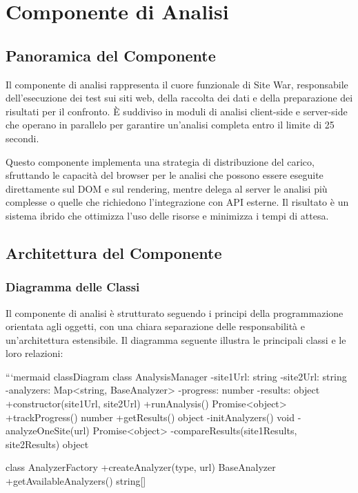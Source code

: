 \chapter{Componente di Analisi}

\section{Panoramica del Componente}
Il componente di analisi rappresenta il cuore funzionale di Site War, responsabile dell'esecuzione dei test sui siti web, della raccolta dei dati e della preparazione dei risultati per il confronto. È suddiviso in moduli di analisi client-side e server-side che operano in parallelo per garantire un'analisi completa entro il limite di 25 secondi.

Questo componente implementa una strategia di distribuzione del carico, sfruttando le capacità del browser per le analisi che possono essere eseguite direttamente sul DOM e sul rendering, mentre delega al server le analisi più complesse o quelle che richiedono l'integrazione con API esterne. Il risultato è un sistema ibrido che ottimizza l'uso delle risorse e minimizza i tempi di attesa.

\section{Architettura del Componente}

\subsection{Diagramma delle Classi}
Il componente di analisi è strutturato seguendo i principi della programmazione orientata agli oggetti, con una chiara separazione delle responsabilità e un'architettura estensibile. Il diagramma seguente illustra le principali classi e le loro relazioni:

```mermaid
classDiagram
    class AnalysisManager {
        -site1Url: string
        -site2Url: string
        -analyzers: Map<string, BaseAnalyzer>
        -progress: number
        -results: object
        +constructor(site1Url, site2Url)
        +runAnalysis() Promise<object>
        +trackProgress() number
        +getResults() object
        -initAnalyzers() void
        -analyzeOneSite(url) Promise<object>
        -compareResults(site1Results, site2Results) object
    }
    
    class AnalyzerFactory {
        +createAnalyzer(type, url) BaseAnalyzer
        +getAvailableAnalyzers() string[]
    }
    
